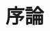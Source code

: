 \documentclass[../main.tex]{subfiles}
\begin{document}
\section{序論}




\bibinsubfile
\end{document}

